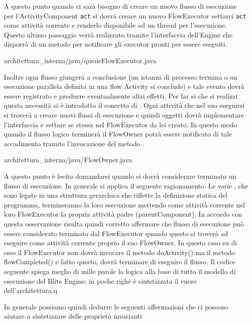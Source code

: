 A questo punto quando ci sarà bisogno di creare un nuovo flusso di esecuzione per
l'ActivityComponent \texttt{act} si dovrà creare un nuovo FlowExecutor settarci
\texttt{act} come attività corrente e renderlo disponibile ad un thread per
l'esecuzione. Questo ultimo passaggio verrà realizzato tramite l'interfaccia
dell'Engine che disporrà di un metodo per notificare gli executor pronti per
essere eseguiti.

 {architettura_interna/java/queueFlowExecutor.java}

Inoltre ogni flusso giungerà a conclusione (un istanza di processo termina o un
esecuzione parallela definita in una flow Activity si conclude) e tale evento
dovrà essere registrato e produrre eventualmente altri effetti. Per far si che si
realizzi questa necessità si \`e introdotto il concetto di .
Ogni attività che nel suo eseguirsi si troverà a creare nuovi flussi di
esecuzione e quindi oggetti   dovrà implementare
l'interfaccia  e settare se stessa nel FlowExecutor da lei
creato. In questo modo quando il flusso logico terminerà il FlowOwner potrà
essere notificato di tale accadimento tramite l'invocazione del metodo
.


{architettura_interna/java/FlowOwner.java}

A questo punto \`e lecito domandarsi quando si dovrà considerare terminato un
flusso di esecuzione. In generale si applica il seguente ragionamento. Le varie
, che sono legate in una struttura gerarchica che
riflette la definizione statica del programma, termineranno la loro esecuzione
mettendo come attività corrente nel loro FlowExecutor la propria attività padre
(parentComponent). In accordo con questa osservazione risulta quindi corretto
affermare che flusso di esecuzione può essere considerato terminato dal
FlowExecutor quando questo si troverà ad eseguire come attività corrente proprio
il suo FlowOwner. In questo caso su di esso il FlowExecutor non dovrà invocare il
metodo doActivity() ma il metodo flowCompleted() e fatto questo, dovrà terminare
di eseguire il flusso. Il codice seguente spiega meglio di mille parole la logica
alla base di tutto il modello di esecuzione del Blite Engine; in poche righe \`e
sintetizzata il cuore dell'architettura.q



In generale possiamo quindi dedurre le seguenti affermazioni che ci possono
aiutare a sintetizzare delle proprietà invarianti

